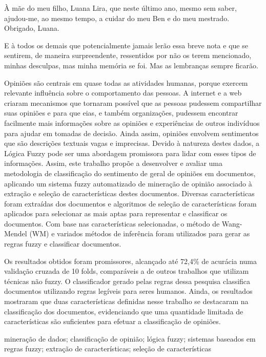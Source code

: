 \documentclass[msc, a4paper, classic, pt]{ufbathesis}
\begin{document}
À mãe do meu filho, Luana Lira, que neste último ano, mesmo sem saber, ajudou-me, ao mesmo tempo, a cuidar do meu Ben e do meu mestrado. Obrigado, Luana.

E à todos os demais que potencialmente jamais lerão essa breve nota e que se sentirem, de maneira surpreendente, ressentidos por não os terem mencionado, minhas desculpas, mas minha memória se foi. Mas as lembranças sempre ficarão.

\resumo
Opiniões são centrais em quase todas as atividades humanas, porque exercem relevante influência sobre o comportamento das pessoas. A internet e a web criaram mecanismos que tornaram possível que as pessoas pudessem compartilhar suas opiniões e para que eias, e também organizações, pudessem encontrar facilmente mais informações sobre as opiniões e experiências de outros indivíduos para ajudar em tomadas de decisão. Ainda assim, opiniões envolvem sentimentos que são descrições textuais vagas e imprecisas. Devido à natureza destes dados, a Lógica Fuzzy pode ser uma abordagem promissora para lidar com esses tipos de informações. Assim, este trabalho propõe a desenvolver e avaliar uma metodologia de classificação do sentimento de geral de opiniões em documentos, aplicando um sistema fuzzy automatizado de mineração de opinião associado à extração e seleção de características destes documentos. Diversas características foram extraídas dos documentos e algoritmos de seleção de características foram aplicados para selecionar as mais aptas para representar e classificar os documentos. Com base nas características selecionadas, o método de Wang-Mendel (WM) e variados métodos de inferência foram utilizados para gerar as regras fuzzy e classificar documentos. 


Os resultados obtidos foram promissores, alcançado até 72,4\% de acurácia numa validação cruzada de 10 folds, comparáveis a de outros trabalhos que utilizam técnicas não fuzzy. O classificador gerado pelas regras dessa pesquisa classifica documentos utilizando regras legíveis para seres humanos. Ainda, os resultados mostraram que duas características definidas nesse trabalho se destacaram na classificação dos documentos, evidenciando que uma quantidade limitada de características são suficientes para efetuar a classificação de opiniões.
\begin{keywords}
mineração de dados; classificação de opinião; lógica fuzzy; sistemas baseados em regras fuzzy; extração de características; seleção de características
\end{keywords}
\end{document}
